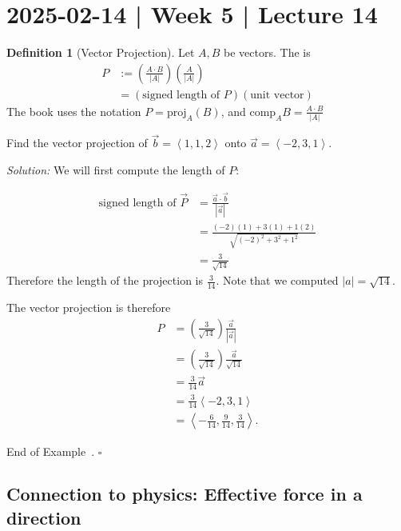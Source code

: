 \documentclass[10pt]{article}
\theoremstyle{definition}
\newtheorem{definition}[theorem]{Definition}
\newtheorem{example}[theorem]{Example}
\renewenvironment{example}
{\begin{oldexample}}
  {\par\smallskip\hfill   End of Example~\theexample. $\square$    \par\end{oldexample}}
\newcommand{\1}[1]{\textbf{1}_{\left[#1\right]}} %
\newcommand{\dempfcolor}[1]{{\color{RoyalBlue}#1}}
\newcommand{\demph}[1]{\dempfcolor{{\sl #1}}}
\begin{document}
\newpage
\section{2025-02-14 | Week 5 | Lecture 14}

\begin{definition}[Vector Projection]
  \label{def:vector-projection}
  Let $A,B$ be vectors. The \demph{vector projection of $B$ along $A$} is
  \begin{align*}
    {P}
    &:= \left( \frac{A\cdot B}{|A|} \right) \left(\frac{A}{|A|}\right)\\
    &= \left( \text{signed length of }P \right)\left( \text{unit vector} \right) \nonumber
  \end{align*}
  The book uses the notation ${P} = \text{proj}_{A}(B)$, and
  $\text{comp}_{A}B= \frac{A\cdot B}{|A|}$
\end{definition}


\begin{example}
  Find the vector projection of $\vec{b}=\left\langle 1,1,2 \right\rangle $ onto
  $\vec{a} = \left\langle -2,3,1 \right\rangle$. 

  \noindent\textit{Solution:} We will first compute the length of $P$:

  \begin{align*}
    \text{signed length of }\overrightarrow{P}
    &= \frac{\vec{a}\cdot \vec{b}}{|\vec{a}|} \\
    &= \frac{(-2)(1)+3(1)+1(2)}{\sqrt{(-2)^{2}+3^{2}+1^{2}}} \\
    &= \frac{3}{\sqrt{14}}
  \end{align*}
  Therefore the length of the projection is $\frac{3}{14}$. Note that we computed $|a|=\sqrt{14}$.

  The vector projection is therefore
  \begin{align*}
    P
    &= \left( \frac{3}{\sqrt{14}} \right) \frac{\vec{a}}{|\vec{a}|}\\
    &= \left( \frac{3}{\sqrt{14}} \right) \frac{\vec{a}}{\sqrt{14}}\\
    &= \frac{3}{14}\vec{a}\\
    &= \frac{3}{14} \left\langle -2, 3,1 \right\rangle \\
    &= \left\langle -\frac{6}{14}, \frac{9}{14}, \frac{3}{14} \right\rangle.
  \end{align*}
\end{example}


\subsection{Connection to physics: Effective force in a direction}
\end{document}
